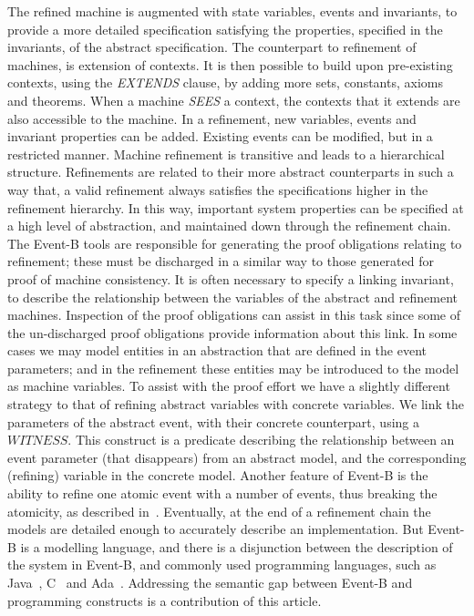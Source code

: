The refined machine is augmented with state variables, events and invariants, to provide a more detailed specification satisfying the properties, specified in the invariants, of the abstract specification. The counterpart to refinement of machines, is extension of contexts. It is then possible to build upon pre-existing contexts, using the \emph{EXTENDS} clause, by adding more sets, constants, axioms and theorems. When a machine \emph{SEES} a context, the contexts that it extends are also accessible to the machine. In a refinement, new variables, events and invariant properties can be added. Existing events can be modified, but in a restricted manner. Machine refinement is transitive and leads to a hierarchical structure. Refinements are related to their more abstract counterparts in such a way that, a valid refinement always satisfies the specifications higher in the refinement hierarchy. In this way, important system properties can be specified at a high level of abstraction, and maintained down through the refinement chain. The Event-B tools are responsible for generating the proof obligations relating to refinement; these must be discharged in a similar way to those generated for proof of machine consistency. It is often necessary to specify a linking invariant, to describe the relationship between the variables of the abstract and refinement machines. Inspection of the proof obligations can assist in this task since some of the un-discharged proof obligations provide information about this link. In some cases we may model entities in an abstraction that are defined in the event parameters; and in the refinement these entities may be introduced to the model as machine variables. To assist with the proof effort we have a slightly different strategy to that of refining abstract variables with concrete variables. We link the parameters of the abstract event, with their concrete counterpart, using a $WITNESS$. This construct is a predicate describing the relationship between an event parameter (that disappears) from an abstract model, and the corresponding (refining) variable in the concrete model. Another feature of Event-B is the ability to  refine one atomic event with a number of events, thus breaking the atomicity, as described in~\cite{Butler08}. Eventually, at the end of a refinement chain the models are detailed enough to accurately describe an implementation. But Event-B is a modelling language, and there is a disjunction between the description of the system in Event-B, and commonly used programming languages, such as Java~\cite{JavaSpec}, C~\cite{KernighanR88} and Ada~\cite{ada2005}. Addressing the semantic gap between Event-B and programming constructs is a contribution of this article. 
%
